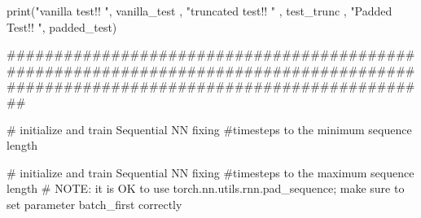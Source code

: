 \documentclass[
  letterpaper,
  DIV=11,
  numbers=noendperiod]{scrartcl}
\newenvironment{Shaded}{\begin{snugshade}}{\end{snugshade}}
\newcommand{\AlertTok}[1]{\textcolor[rgb]{0.68,0.00,0.00}{#1}}
\newcommand{\BuiltInTok}[1]{\textcolor[rgb]{0.00,0.23,0.31}{#1}}
\newcommand{\CommentTok}[1]{\textcolor[rgb]{0.37,0.37,0.37}{#1}}
\newcommand{\NormalTok}[1]{\textcolor[rgb]{0.00,0.23,0.31}{#1}}
\newcommand{\StringTok}[1]{\textcolor[rgb]{0.13,0.47,0.30}{#1}}
\begin{document}
\begin{Shaded}
\begin{Highlighting}[]
\BuiltInTok{print}\NormalTok{(}\StringTok{"vanilla test!!  "}\NormalTok{, vanilla\_test , }\StringTok{"truncated test!! "}\NormalTok{ , test\_trunc , }\StringTok{"Padded Test!! "}\NormalTok{, padded\_test)}


\CommentTok{\#\#\#\#\#\#\#\#\#\#\#\#\#\#\#\#\#\#\#\#\#\#\#\#\#\#\#\#\#\#\#\#\#\#\#\#\#\#\#\#\#\#\#\#\#\#\#\#\#\#\#\#\#\#\#\#\#\#\#\#\#\#\#\#\#\#\#\#\#\#\#\#\#\#\#\#\#\#\#\#\#\#\#\#\#\#\#\#\#\#\#\#\#\#\#\#\#\#\#\#\#\#\#\#\#\#\#\#\#\#\#\#\#\#\#\#\#\#\#\#\#\#\#\#\#\#\#\#\#\#\#}

\CommentTok{\# initialize and train Sequential NN fixing \#timesteps to the minimum sequence length}

\CommentTok{\# initialize and train Sequential NN fixing \#timesteps to the maximum sequence length}
\CommentTok{\# }\AlertTok{NOTE}\CommentTok{: it is OK to use torch.nn.utils.rnn.pad\_sequence; make sure to set parameter batch\_first correctly}
\end{Highlighting}
\end{Shaded}
\end{document}
